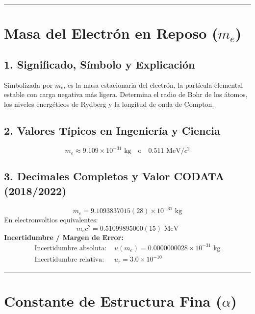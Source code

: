 \documentclass[12pt,a4paper]{article}
\begin{document}
\vspace{0.8cm}
\hrule
\vspace{0.8cm}

\section{Masa del Electrón en Reposo ($m_e$)}

\subsection*{1. Significado, Símbolo y Explicación}
Simbolizada por $m_e$, es la masa estacionaria del electrón, la partícula elemental estable con carga negativa más ligera. Determina el radio de Bohr de los átomos, los niveles energéticos de Rydberg y la longitud de onda de Compton.

\subsection*{2. Valores Típicos en Ingeniería y Ciencia}
\begin{equation*}
m_e \approx 9.109 \times 10^{-31} \text{ kg} \quad \text{o} \quad 0.511 \text{ MeV}/c^2
\end{equation*}

\subsection*{3. Decimales Completos y Valor CODATA (2018/2022)}
\begin{equation*}
m_e = 9.1093837015(28) \times 10^{-31} \text{ kg}
\end{equation*}
En electronvoltios equivalentes:
\begin{equation*}
m_e c^2 = 0.51099895000(15) \text{ MeV}
\end{equation*}
\textbf{Incertidumbre / Margen de Error:}
\begin{align*}
\text{Incertidumbre absoluta: } & u(m_e) = 0.0000000028 \times 10^{-31} \text{ kg} \\
\text{Incertidumbre relativa: } & u_r = 3.0 \times 10^{-10}
\end{align*}

\vspace{0.8cm}
\hrule
\vspace{0.8cm}

\section{Constante de Estructura Fina ($\alpha$)}
\end{document}

